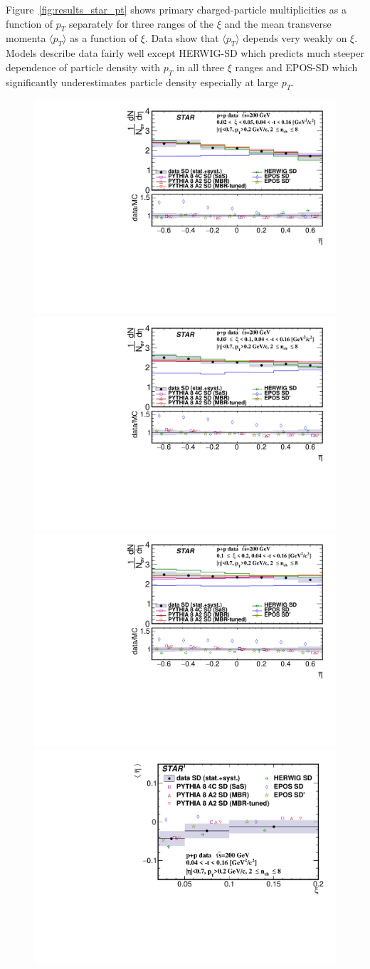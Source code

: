 Figure~\ref{fig:results_star_pt} shows primary charged-particle multiplicities as a function of $p_T$  separately for three ranges of the $\xi$ and the mean transverse momenta $\langle p_T\rangle$ as a function of $\xi$. Data show that $\langle p_T\rangle$ depends very weakly on $\xi$. Models describe data fairly well except HERWIG-SD which predicts much steeper dependence of particle density with $p_T$ in all three $\xi$ ranges and EPOS-SD which significantly underestimates particle density especially at large $p_T$.
\begin{figure}[h!]
	\centering
	\includegraphics[width=.49\textwidth,page=1]{chapters/chrgSTAR/img/results/out_eta_SD_0.pdf}
	\hfill
	\includegraphics[width=.49\textwidth,page=1]{chapters/chrgSTAR/img/results/out_eta_SD_1.pdf}
	\newline
	\includegraphics[width=.49\textwidth,page=1]{chapters/chrgSTAR/img/results/out_eta_SD_2.pdf}
	\hfill
	\includegraphics[width=.49\textwidth,page=1]{chapters/chrgSTAR/img/results/mean_eta_xi.pdf}

\end{figure}
